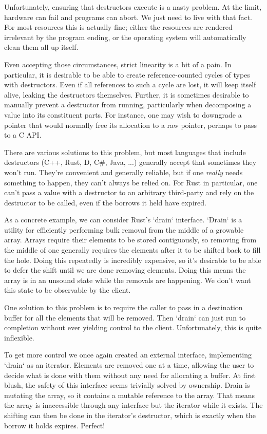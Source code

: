 Unfortunately, ensuring that destructors execute is a nasty problem.
At the limit, hardware can fail and programs can abort. We just need to live
with that fact. For most resources this is actually fine; either the resources are
rendered irrelevant by the program ending, or the operating system will automatically
clean them all up itself.

Even accepting those circumstances, strict
linearity is a bit of a pain. In particular, it is desirable to be able to
create reference-counted cycles of types with destructors. Even if all references to
such a cycle are lost, it will keep itself alive, leaking the destructors
themselves. Further, it is sometimes desirable to manually prevent a destructor
from running, particularly when decomposing a value into its constituent parts. For
instance, one may wish to downgrade a pointer that would normally free its allocation
to a raw pointer, perhaps to pass to a C API.

There are various solutions to this problem, but most languages that include
destructors (C++, Rust, D, C\#, Java, ...) generally accept that sometimes
they won't run. They're convenient and generally
reliable, but if one \emph{really} needs something to happen, they can't always be
relied on. For Rust in particular, one can't pass a value with a destructor to
an arbitrary third-party and rely on the destructor to be called, even if
the borrows it held have expired.

As a concrete example, we can consider Rust's `drain` interface. `Drain` is a
utility for efficiently performing bulk removal from the middle of a growable
array. Arrays require their elements to be stored contiguously, so removing
from the middle of one generally requires the elements after it to be
shifted back to fill the hole. Doing this repeatedly is incredibly expensive,
so it's desirable to be able to defer the shift until we are done removing
elements. Doing this means the array is in an unsound state while the
removals are happening. We don't want this state to be observable by the client.

One solution to this problem is to require the caller to pass in a
destination buffer for all the elements that will be removed. Then `drain` can
just run to completion without ever yielding control to the client. Unfortunately,
this is quite inflexible.

To get more control we once again created an external interface, implementing
`drain` as an iterator. Elements are removed one at a time, allowing the user to
decide what is done with them without any need for allocating a buffer. At first
blush, the safety of this interface seems trivially solved by ownership. Drain is mutating the
array, so it contains a mutable reference to the array. That means the array is
inaccessible through any interface but the iterator while it exists. The
shifting can then be done in the iterator's destructor, which is exactly when
the borrow it holds expires. Perfect!

